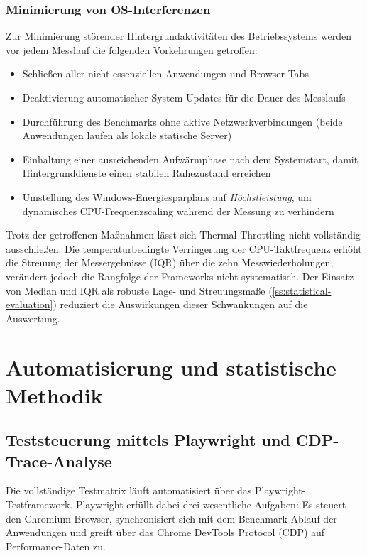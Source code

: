 \subsubsection{Minimierung von OS-Interferenzen}
\label{sss:os-interference}

Zur Minimierung störender Hintergrundaktivitäten des Betriebssystems werden vor jedem Messlauf die folgenden Vorkehrungen getroffen:

\begin{itemize}
	\item Schließen aller nicht-essenziellen Anwendungen und Browser-Tabs
	\item Deaktivierung automatischer System-Updates für die Dauer des Messlaufs
	\item Durchführung des Benchmarks ohne aktive Netzwerkverbindungen (beide Anwendungen laufen als lokale statische Server)
	\item Einhaltung einer ausreichenden Aufwärmphase nach dem Systemstart, damit Hintergrunddienste einen stabilen Ruhezustand erreichen
    \item Umstellung des Windows-Energiesparplans auf \textit{Höchstleistung}, um dynamisches CPU-Frequenzscaling während der Messung zu verhindern \cite{microsoft-windowsserver-powerplan-2026}
\end{itemize}
Trotz der getroffenen Maßnahmen lässt sich Thermal Throttling nicht vollständig ausschließen. Die temperaturbedingte Verringerung der CPU-Taktfrequenz erhöht die Streuung der Messergebnisse (IQR) über die zehn Messwiederholungen, verändert jedoch die Rangfolge der Frameworks nicht systematisch. Der Einsatz von Median und IQR als robuste Lage- und Streuungsmaße (\cref{ss:statistical-evaluation}) reduziert die Auswirkungen dieser Schwankungen auf die Auswertung.
\section{Automatisierung und statistische Methodik}
\label{s:automation-and-statistics}

\subsection{Teststeuerung mittels Playwright und CDP-Trace-Analyse}
\label{ss:test-orchestration}

Die vollständige Testmatrix läuft automatisiert über das Playwright-Testframework. Playwright erfüllt dabei drei wesentliche Aufgaben: Es steuert den Chromium-Browser, synchronisiert sich mit dem Benchmark-Ablauf der Anwendungen und greift über das Chrome DevTools Protocol (CDP) auf Performance-Daten zu.

